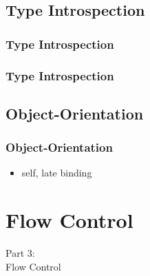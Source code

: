 \subsection{Type Introspection}
\begin{frame}
    \frametitle{Type Introspection}
    \vspace{0mm}
    \contentTypeIntrospectionI
\end{frame}
\begin{frame}
    \frametitle{Type Introspection}
    \vspace{0mm}
    \contentTypeIntrospectionII
\end{frame}

\subsection{Object-Orientation}
\begin{frame}
    \frametitle{Object-Orientation}
    \vspace{5mm}
    
    \begin{itemize}
      \item self, late binding
    \end{itemize}
\end{frame}


\section{Flow Control}
\begin{frame}
    \vspace{25mm}
    \begin{center}
        \Huge{Part 3:\\Flow Control}
    \end{center}
\end{frame}

